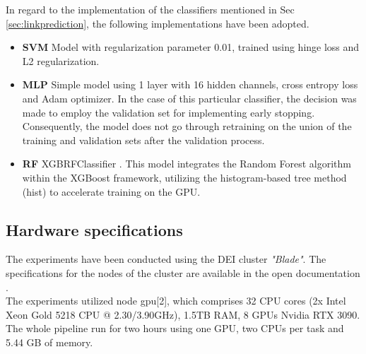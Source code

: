In regard to the implementation of the classifiers mentioned in Sec \ref{sec:linkprediction}, the following implementations have been adopted.
\begin{itemize}
    \item \textbf{SVM} Model with regularization parameter 0.01, trained using hinge loss and L2 regularization.
    \item \textbf{MLP} Simple model using 1 layer with 16 hidden channels, cross entropy loss and Adam optimizer.
    In the case of this particular classifier, the decision was made to employ the validation set for implementing early stopping. 
    Consequently, the model does not go through retraining on the union of the training and validation sets after the validation process.
    \item \textbf{RF} XGBRFClassifier \cite{RFImpl}. 
    This model integrates the Random Forest algorithm within the XGBoost framework, utilizing the histogram-based tree method (hist) to accelerate training on the GPU.
\end{itemize}

\subsection{Hardware specifications}
The experiments have been conducted using the DEI cluster \emph{"Blade"}.
The specifications for the nodes of the cluster are available in the open documentation \cite{ClusterDEI}.
\\
The experiments utilized node gpu[2], which comprises 32 CPU cores (2x Intel Xeon Gold 5218 CPU @ 2.30/3.90GHz), 1.5TB RAM, 8 GPUs Nvidia RTX 3090.
The whole pipeline run for two hours using one GPU, two CPUs per task and 5.44 GB of memory.
